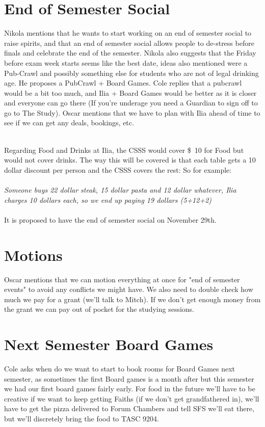 \documentclass[12pt]{article}
\begin{document}
\section{End of Semester Social}\label{sec:EoSS}
\noindent Nikola mentions that he wants to start working on an end of semester social to raise spirits, and that an end of semester social allows people to de-stress before finals and celebrate the end of the semester. Nikola also suggests that the Friday before exam week starts seems like the best date, ideas also mentioned were a Pub-Crawl and possibly something else for students who are not of legal drinking age. He proposes a PubCrawl + Board Games. Cole replies that a pubcrawl would be a bit too much, and Ilia + Board Games would be better as it is closer and everyone can go there (If you're underage you need a Guardian to sign off to go to The Study). Oscar mentions that we have to plan with Ilia ahead of time to see if we can get any deals, bookings, etc.  \\\ 

\noindent Regarding Food and Drinks at Ilia, the CSSS would cover \$\ 10 for Food but would not cover drinks. The way this will be covered is that each table gets a 10 dollar discount per person and the CSSS covers the rest: So for example:  \\ \\
{\em Someone buys 22 dollar steak, 15 dollar pasta and 12 dollar whatever, Ilia charges 10 dollars each, so we end up paying 19 dollars (5+12+2)} \\ \\ 

\noindent It is proposed to have the end of semester social on November 29th.

\section{Motions} \label{sec:Motion}
\noindent Oscar mentions that we can motion everything at once for "end of semester events" to avoid any conflicts we might have. We also need to double check how much we pay for a grant (we'll talk to Mitch). If we don't get enough money from the grant we can pay out of pocket for the studying sessions. 

\section{Next Semester Board Games} \label{sec:Board}
\noindent Cole asks when do we want to start to book rooms for Board Games next semester, as sometimes the first Board games is a month after but this semester we had our first board games fairly early. For food in the future we'll have to be creative if we want to keep getting Faiths (if we don't get grandfathered in), we'll have to get the pizza delivered to Forum Chambers and tell SFS we'll eat there, but we'll discretely bring the food to TASC 9204.  \\ 
\end{document}
